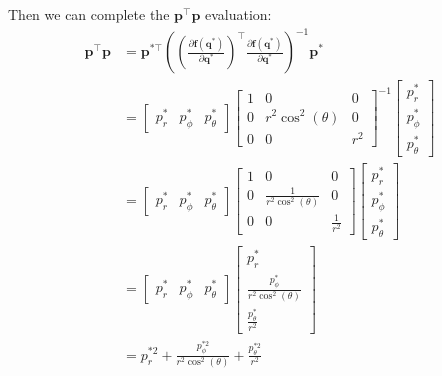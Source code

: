 \documentclass[titlepage]{article}
\begin{document}
Then we can complete the $\boldsymbol{p}^\top\boldsymbol{p}$ evaluation:
\begin{equation}
	\begin{split}
		\boldsymbol{p}^\top\boldsymbol{p}&=\boldsymbol{p}^{*\top}\left(\left(\frac{\partial\boldsymbol{f}(\boldsymbol{q}^*)}{\partial\boldsymbol{q}^*}\right)^\top\frac{\partial\boldsymbol{f}(\boldsymbol{q}^*)}{\partial\boldsymbol{q}^*}\right)^{-1}\boldsymbol{p}^* \\
		&=
		\begin{bmatrix}
			p_r^* & p_\phi^* & p_\theta^*
		\end{bmatrix}
		\begin{bmatrix}
			1 & 0 & 0 \\
			0 & r^2\cos^2(\theta) & 0 \\
			0 & 0 & r^2
		\end{bmatrix}^{-1}
		\begin{bmatrix}
			p_r^* \\
			p_\phi^* \\
			p_\theta^*
		\end{bmatrix} \\
		&=
		\begin{bmatrix}
			p_r^* & p_\phi^* & p_\theta^*
		\end{bmatrix}
		\begin{bmatrix}
			1 & 0 & 0 \\
			0 & \frac{1}{r^2\cos^2(\theta)} & 0 \\
			0 & 0 & \frac{1}{r^2}
		\end{bmatrix}
		\begin{bmatrix}
			p_r^* \\
			p_\phi^* \\
			p_\theta^*
		\end{bmatrix} \\
		&=
		\begin{bmatrix}
			p_r^* & p_\phi^* & p_\theta^*
		\end{bmatrix}
		\begin{bmatrix}
			p_r^* \\
			\frac{p_\phi^*}{r^2\cos^2(\theta)} \\
			\frac{p_\theta^*}{r^2}
		\end{bmatrix} \\
		&=p_r^{*2}+\frac{p_\phi^{*2}}{r^2\cos^2(\theta)}+\frac{p_\theta^{*2}}{r^2}
	\end{split}
	\label{eq:pdotprod}
\end{equation}
\end{document}
